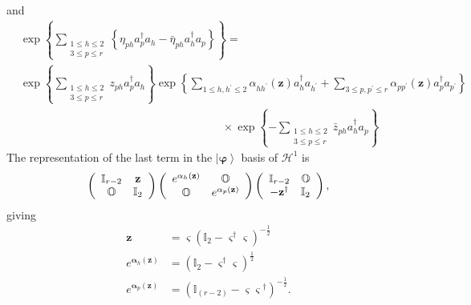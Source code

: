 \documentclass[aps,preprint]{revtex4}%
\begin{document}
and%
\begin{align}
&  \exp\left\{  \sum\limits_{\substack{1\leq h\leq2\\3\leq p\leq r}}\left\{
\eta_{ph}a_{p}^{\dagger}a_{h}-\bar{\eta}_{ph}a_{h}^{\dagger}a_{p}\right\}
\right\}  =\nonumber\\
&  \exp\left\{  \sum\limits_{\substack{1\leq h\leq2\\3\leq p\leq r}%
}z_{ph}a_{p}^{\dagger}a_{h}\right\}  \exp\left\{  \sum\limits_{1\leq
h,h^{\prime}\leq2}\alpha_{hh^{\prime}}\left(  \mathbf{z}\right)
a_{h}^{\dagger}a_{h^{\prime}}+\sum\limits_{3\leq p,p^{\prime}\leq r}%
\alpha_{pp^{\prime}}\left(  \mathbf{z}\right)  a_{p}^{\dagger}a_{p^{\prime}%
}\right\} \nonumber\\
&  \qquad\qquad\qquad\qquad\qquad\qquad\qquad\qquad\qquad\times\exp\left\{
-\sum\limits_{\substack{1\leq h\leq2\\3\leq p\leq r}}\bar{z}_{ph}%
a_{h}^{\dagger}a_{p}\right\}
\end{align}
The representation of the last term in the $\left\vert \mathbf{\varphi
}\right\rangle $ basis of $\mathcal{H}^{1}$ is
\begin{equation}
\left(
\begin{array}
[c]{cc}%
\mathbb{I}_{r-2} & \mathbf{z}\\
\mathbb{O} & \mathbb{I}_{2}%
\end{array}
\right)  \left(
\begin{array}
[c]{cc}%
e^{\mathbf{\alpha}_{h}\left(  \mathbf{z}\right)  } & \mathbb{O}\\
\mathbb{O} & e^{\mathbf{\alpha}_{p}\left(  \mathbf{z}\right)  }%
\end{array}
\right)  \left(
\begin{array}
[c]{cc}%
\mathbb{I}_{r-2} & \mathbb{O}\\
-\mathbf{z}^{\dagger} & \mathbb{I}_{2}%
\end{array}
\right)  ,
\end{equation}
giving%
\begin{align}
\mathbf{z}  &  =\mathbf{\varsigma}\left(  \mathbb{I}_{2}-\mathbf{\varsigma
}^{\dagger}\mathbf{\varsigma}\right)  ^{-\frac{1}{2}}\nonumber\\
e^{\mathbf{\alpha}_{h}\left(  \mathbf{z}\right)  }  &  =\left(  \mathbb{I}%
_{2}-\mathbf{\varsigma}^{\dagger}\mathbf{\varsigma}\right)  ^{\frac{1}{2}%
}\nonumber\\
e^{\mathbf{\alpha}_{p}\left(  \mathbf{z}\right)  }  &  =\left(  \mathbb{I}%
_{\left(  r-2\right)  }-\mathbf{\varsigma\varsigma}^{\dagger}\right)
^{-\frac{1}{2}}.
\end{align}
\end{document}
